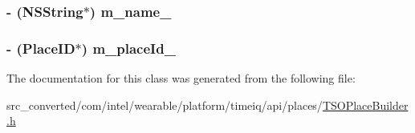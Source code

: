 \subsubsection[{m\+\_\+name\+\_\+}]{\setlength{\rightskip}{0pt plus 5cm}-\/ (N\+S\+String$\ast$) m\+\_\+name\+\_\+}\label{interface_t_s_o_place_builder_a3dd3a2b22a8a3dc1442ae684de0fb742}
\hypertarget{interface_t_s_o_place_builder_a73df03604f11c22f379663fdea5da2be}{}
\subsubsection[{m\+\_\+place\+Id\+\_\+}]{\setlength{\rightskip}{0pt plus 5cm}-\/ (Place\+I\+D$\ast$) m\+\_\+place\+Id\+\_\+}\label{interface_t_s_o_place_builder_a73df03604f11c22f379663fdea5da2be}


The documentation for this class was generated from the following file\+:\begin{DoxyCompactItemize}
\item 
src\+\_\+converted/com/intel/wearable/platform/timeiq/api/places/\hyperlink{_t_s_o_place_builder_8h}{T\+S\+O\+Place\+Builder.\+h}\end{DoxyCompactItemize}
